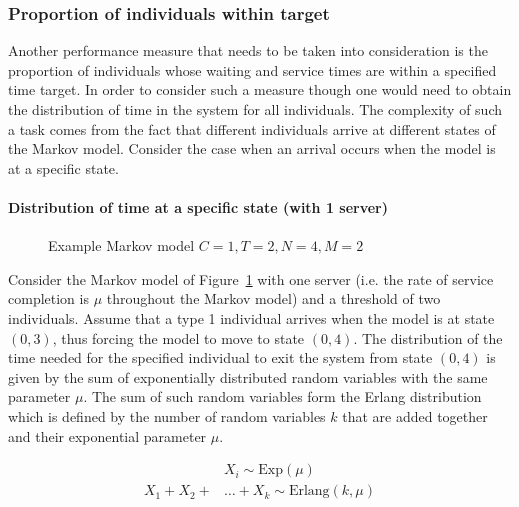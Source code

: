\subsubsection{Proportion of individuals within target}
\label{sec:proportion_of_individuals_within_time}

Another performance measure that needs to be taken into consideration is the
proportion of individuals whose waiting and service times are within a
specified time target.
In order to consider such a measure though one would need to obtain the
distribution of time in the system for all individuals.
The complexity of such a task comes from the fact that different individuals
arrive at different states of the Markov model.
Consider the case when an arrival occurs when the model is at a specific state.

\paragraph{Distribution of time at a specific state (with 1 server)}

\begin{figure}[H]
    \centering
    \scalebox{0.75}{}
    \caption{Example Markov model \(C=1, T=2, N=4, M=2\)}
    \label{fig:distribution_of_time_at_specific_state_1_server}
\end{figure}

Consider the Markov model of
Figure~\ref{fig:distribution_of_time_at_specific_state_1_server}
with one server (i.e.
the rate of service completion is \(\mu\) throughout the Markov model)
and a threshold of two individuals.
Assume that a type 1 individual arrives when the model is at state
\((0,3)\), thus forcing the model to move to state \((0,4)\).
The distribution of the time needed for the specified individual to exit the
system from state \((0,4)\) is given by the sum of exponentially distributed
random variables with the same parameter \(\mu\).
The sum of such random variables form the Erlang distribution which is defined
by the number of random variables \(k\) that are added together and their
exponential parameter \(\mu\).

\begin{align}
    & X_i \sim \text{Exp}(\mu) \nonumber \\
    X_1 + X_2 + & \dots + X_k \sim \text{Erlang}(k,\mu)
    \label{eq:erlang_distribution_definition}
\end{align}

